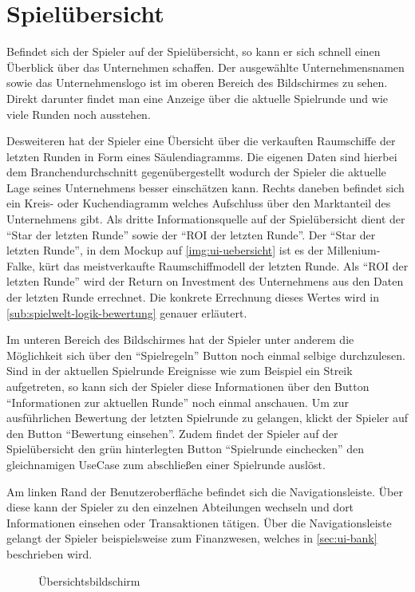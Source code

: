 \section{Spielübersicht}
\label{sec:ui-uebersicht}


Befindet sich der Spieler auf der Spielübersicht, so kann er sich schnell einen Überblick über das Unternehmen schaffen. Der ausgewählte Unternehmensnamen sowie das Unternehmenslogo ist im oberen Bereich des Bildschirmes zu sehen. Direkt darunter findet man eine Anzeige über die aktuelle Spielrunde und wie viele Runden noch ausstehen. 

Desweiteren hat der Spieler eine Übersicht über die verkauften Raumschiffe der letzten Runden in Form eines Säulendiagramms. Die eigenen Daten sind hierbei dem Branchendurchschnitt gegenübergestellt wodurch der Spieler die aktuelle Lage seines Unternehmens besser einschätzen kann. Rechts daneben befindet sich ein Kreis- oder Kuchendiagramm welches Aufschluss über den Marktanteil des Unternehmens gibt. Als dritte Informationsquelle auf der Spielübersicht dient der “Star der letzten Runde” sowie der “ROI der letzten Runde”. Der “Star der letzten Runde”, in dem Mockup auf \vref{img:ui-uebersicht} ist es der Millenium-Falke, kürt das meistverkaufte Raumschiffmodell der letzten Runde. Als “ROI der letzten Runde” wird der Return on Investment des Unternehmens aus den Daten der letzten Runde errechnet. Die konkrete Errechnung dieses Wertes wird in \vref{sub:spielwelt-logik-bewertung} genauer erläutert.

Im unteren Bereich des Bildschirmes hat der Spieler unter anderem die Möglichkeit sich über den “Spielregeln” Button noch einmal selbige durchzulesen. Sind in der aktuellen Spielrunde Ereignisse wie zum Beispiel ein Streik aufgetreten, so kann sich der Spieler diese Informationen über den Button “Informationen zur aktuellen Runde” noch einmal anschauen. Um zur ausführlichen Bewertung der letzten Spielrunde zu gelangen, klickt der Spieler auf den Button “Bewertung einsehen”. Zudem findet der Spieler auf der Spielübersicht den grün hinterlegten Button “Spielrunde einchecken” den gleichnamigen UseCase zum abschließen einer Spielrunde auslöst. 

Am linken Rand der Benutzeroberfläche befindet sich die Navigationsleiste. Über diese kann der Spieler zu den einzelnen Abteilungen wechseln und dort Informationen einsehen oder Transaktionen tätigen. Über die Navigationsleiste gelangt der Spieler beispielsweise zum Finanzwesen, welches in \ref{sec:ui-bank} beschrieben wird. 

\begin{figure}[htb]
  \centering
  \caption{Übersichtsbildschirm}
  \label{img:ui-uebersicht}
\end{figure}

\autorende{}